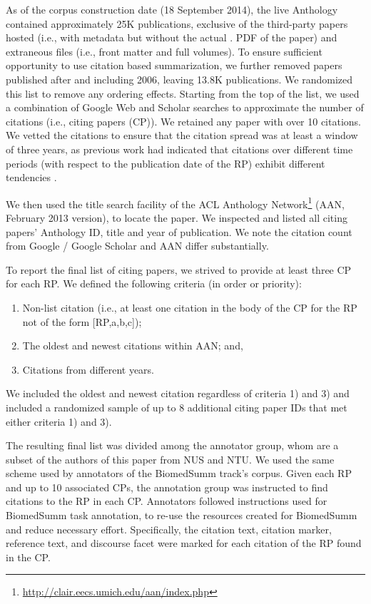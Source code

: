 \documentclass[11pt]{article}
\begin{document}
As of the corpus construction date (18 September 2014), the live
Anthology contained approximately 25K publications, exclusive of the
third-party papers hosted (i.e., with metadata but without the actual
. PDF of the paper) and extraneous files (i.e., front matter and full
volumes).  To ensure sufficient opportunity to use citation based
summarization, we further removed papers published after and including
2006, leaving 13.8K publications.  We randomized this list to remove
any ordering effects.  Starting from the top of the list, we used a
combination of Google Web and Scholar searches to approximate the
number of citations (i.e., citing papers (CP)). We retained any paper
with over 10 citations.  We vetted the citations to ensure that the
citation spread was at least a window of three years, as previous work
had indicated that citations over different time periods (with respect
to the publication date of the RP) exhibit different tendencies
\cite{N13-1067}.

We then used the title search facility of the ACL Anthology
Network\footnote{\url{http://clair.eecs.umich.edu/aan/index.php}}
(AAN, February 2013 version), to locate the paper. We inspected and
listed all citing papers' Anthology ID, title and year of publication.
We note the citation count from Google / Google Scholar and AAN differ
substantially.

To report the final list of citing papers, we strived to provide at
least three CP for each RP. We defined the following
criteria (in order or priority):
\begin{enumerate}
\item Non-list citation (i.e., at least one citation in the body of
  the CP for the RP not of the form [RP,a,b,c]);
\vspace{-.3cm}
\item The oldest and newest
citations within AAN; and, 
\vspace{-.3cm}
\item Citations from different years. 
\end{enumerate}

We included the oldest and newest citation regardless of criteria 1)
and 3) and included a randomized sample of up to 8 additional citing
paper IDs that met either criteria 1) and 3). 

The resulting final list was divided among the annotator group, whom
are a subset of the authors of this paper from NUS and NTU.  We used
the same scheme used by annotators of the BiomedSumm track's corpus.
Given each RP and up to 10 associated CPs, the annotation group was
instructed to find citations to the RP in each CP. Annotators followed
instructions used for BiomedSumm task annotation, to re-use the
resources created for BiomedSumm and reduce necessary effort.
Specifically, the citation text, citation marker, reference text, and
discourse facet were marked for each citation of the RP found in the
CP.
\end{document}
